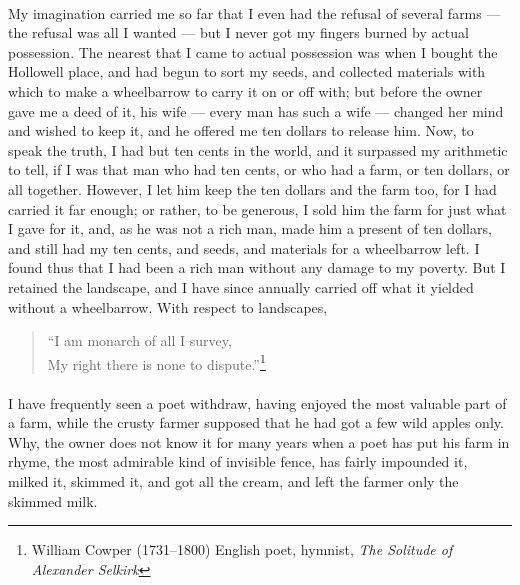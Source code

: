 \documentclass[letterpaper,12pt]{article}
\begin{document}
\paragraph{} My imagination carried me so far that I even had the refusal of
several farms --- the refusal was all I wanted --- but I never got my fingers
burned by actual possession. The nearest that I came to actual possession was
when I bought the Hollowell place, and had begun to sort my seeds, and collected
materials with which to make a wheelbarrow to carry it on or off with; but
before the owner gave me a deed of it, his wife --- every man has such a wife
--- changed her mind and wished to keep it, and he offered me ten dollars to
release him. Now, to speak the truth, I had but ten cents in the world, and it
surpassed my arithmetic to tell, if I was that man who had ten cents, or who had
a farm, or ten dollars, or all together. However, I let him keep the ten dollars
and the farm too, for I had carried it far enough; or rather, to be generous,
I sold him the farm for just what I gave for it, and, as he was not a rich man,
made him a present of ten dollars, and still had my ten cents, and seeds, and
materials for a wheelbarrow left. I found thus that I had been a rich man
without any damage to my poverty. But I retained the landscape, and I have since
annually carried off what it yielded without a wheelbarrow. With respect to
landscapes,

\begin{verse}
    \enquote{I am monarch of all I survey, \\
        My right there is none to dispute.}\footnote{William Cowper (1731--1800)
        English poet, hymnist, \textit{The Solitude of Alexander Selkirk}}
\end{verse}

\paragraph{} I have frequently seen a poet withdraw, having enjoyed the most
valuable part of a farm, while the crusty farmer supposed that he had got a few
wild apples only. Why, the owner does not know it for many years when a poet has
put his farm in rhyme, the most admirable kind of invisible fence, has fairly
impounded it, milked it, skimmed it, and got all the cream, and left the farmer
only the skimmed milk.
\end{document}
